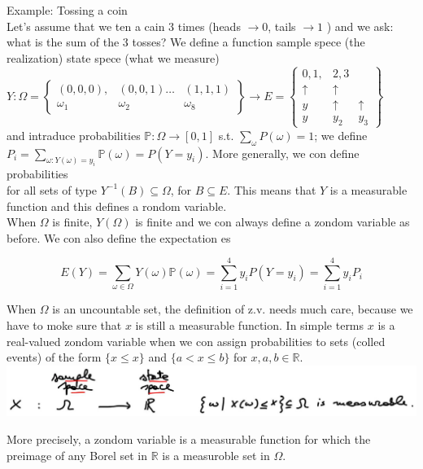 \documentclass[10pt]{article}
\begin{document}
Example: Tossing a coin\\
Let's assume that we ten a cain 3 times (heads $\rightarrow 0$, tails $\rightarrow 1$ ) and we ask: what is the sum of the 3 tosses? We define a function sample spece (the realization) state spece (what we measure)\\
$Y: \Omega=\left\{\begin{array}{ccc}(0,0,0), & (0,0,1) \ldots & (1,1,1) \\ \omega_{1} & \omega_{2} & \omega_{8}\end{array}\right\} \longrightarrow E=\left\{\begin{array}{ccc}0,1, & 2,3 \\ \uparrow & \uparrow \\ y & \uparrow & \uparrow \\ y & y_{2} & y_{3}\end{array}\right\}$\\
and intraduce probabilities $\mathbb{P}: \Omega \rightarrow[0,1]$ s.t. $\sum_{\omega} P(\omega)=1$; we define $P_{i}=\sum_{\omega: Y(\omega)=y_{i}} \mathbb{P}(\omega)=P\left(Y=y_{i}\right)$. More generally, we con define probabilities\\
for all sets of type $Y^{-1}(B) \subseteq \Omega$, for $B \subseteq E$. This means that $Y$ is a measurable function and this defines a rondom variable.\\
When $\Omega$ is finite, $Y(\Omega)$ is finite and we con always define a zondom variable as before. We con also define the expectation es

$$
E(Y)=\sum_{\omega \in \Omega} Y(\omega) \mathbb{P}(\omega)=\sum_{i=1}^{4} y_{i} P\left(Y=y_{i}\right)=\sum_{i=1}^{4} y_{i} P_{i}
$$

When $\Omega$ is an uncountable set, the definition of z.v. needs much care, because we have to moke sure that $x$ is still a measurable function. In simple terms $x$ is a real-valued zondom variable when we con assign probabilities to sets (colled events) of the form $\{x \leq x\}$ and $\{a<x \leq b\}$ for $x, a, b \in \mathbb{R}$.\\
\includegraphics[max width=\textwidth, center]{2025_10_17_79731b7d4e7690819b81g-02}

More precisely, a zondom variable is a measurable function for which the preimage of any Borel set in $\mathbb{R}$ is a measuroble set in $\Omega$.
\end{document}

